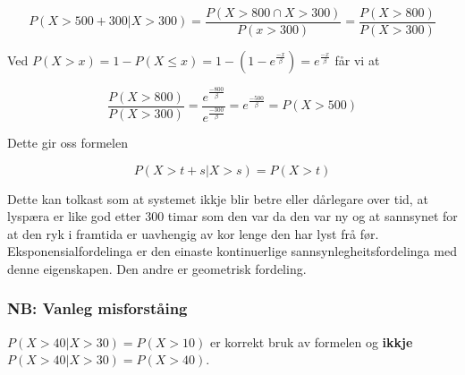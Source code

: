 \begin{equation}
    P(X > 500 + 300 | X > 300) = \frac{P(X > 800 \cap X > 300)}{P(x > 300)} = \frac{P(X > 800)}{P(X > 300)} 
\end{equation}

Ved $P(X > x) = 1 - P(X \leq x) = 1 - (1 - e^\frac{-x}{\beta}) = e^\frac{-x}{\beta}$ får vi at

\begin{equation}
    \frac{P(X > 800)}{P(X > 300)} = \frac{e^\frac{-800}{\beta}}{e^\frac{-300}{\beta}} = e^\frac{-500}{\beta} = P(X > 500)
\end{equation}

Dette gir oss formelen

\begin{equation}
    P(X > t + s | X > s) = P(X > t)
\end{equation}

Dette kan tolkast som at systemet ikkje blir betre eller dårlegare over tid, at lyspæra er like god etter 300 timar som den var da den var ny og at sannsynet for at den ryk i framtida er uavhengig av kor lenge den har lyst frå før. Eksponensialfordelinga er den einaste kontinuerlige sannsynlegheitsfordelinga med denne eigenskapen. Den andre er geometrisk fordeling. 

\subsubsection{NB: Vanleg misforståing}
$P(X > 40 | X > 30) = P(X > 10)$ er korrekt bruk av formelen og \textbf{ikkje}
$P(X > 40 | X > 30) = P(X > 40)$. 